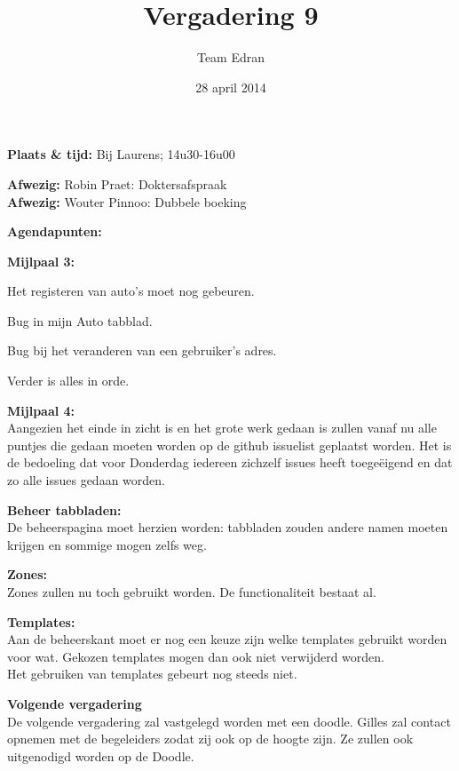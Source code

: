 \documentclass[11pt,a4paper,oneside]{article}
\title{Vergadering 9}
\author{Team Edran}
\date{28 april 2014}
\renewenvironment{itemize}[1]{\begin{compactitem}#1}{\end{compactitem}}
\begin{document}
\maketitle

\textbf{Plaats \& tijd:}
Bij Laurens; 14u30-16u00\par
\textbf{Afwezig:} Robin Praet: Doktersafspraak\\
\textbf{Afwezig:} Wouter Pinnoo: Dubbele boeking \par
\textbf{Agendapunten:}
\begin{itemize}
\item \textbf{Mijlpaal 3:}\\
\begin{itemize}
\item Het registeren van auto's moet nog gebeuren.
\item Bug in mijn Auto tabblad.
\item Bug bij het veranderen van een gebruiker's adres.
\item Verder is alles in orde.
\end{itemize}

\item \textbf{Mijlpaal 4:\\}
Aangezien het einde in zicht is en het grote werk gedaan is zullen vanaf nu alle puntjes die gedaan moeten worden op de github issuelist geplaatst worden. Het is de bedoeling dat voor Donderdag iedereen zichzelf issues heeft toege\"{e}igend en dat zo alle issues gedaan worden. 


\item \textbf{Beheer tabbladen:\\}
De beheerspagina moet herzien worden: tabbladen zouden andere namen moeten krijgen en sommige mogen zelfs weg.

\item \textbf{Zones:\\}
Zones zullen nu toch gebruikt worden. De functionaliteit bestaat al.

\item \textbf{Templates:\\}
Aan de beheerskant moet er nog een keuze zijn welke templates gebruikt worden voor wat. Gekozen templates mogen dan ook niet verwijderd worden.\\
Het gebruiken van templates gebeurt nog steeds niet.


\par\item \textbf{Volgende vergadering} \\
De volgende vergadering zal vastgelegd worden met een doodle. Gilles zal contact opnemen met de begeleiders zodat zij ook op de hoogte zijn. Ze zullen ook uitgenodigd worden op de Doodle.

\end{itemize}
\end{document}
